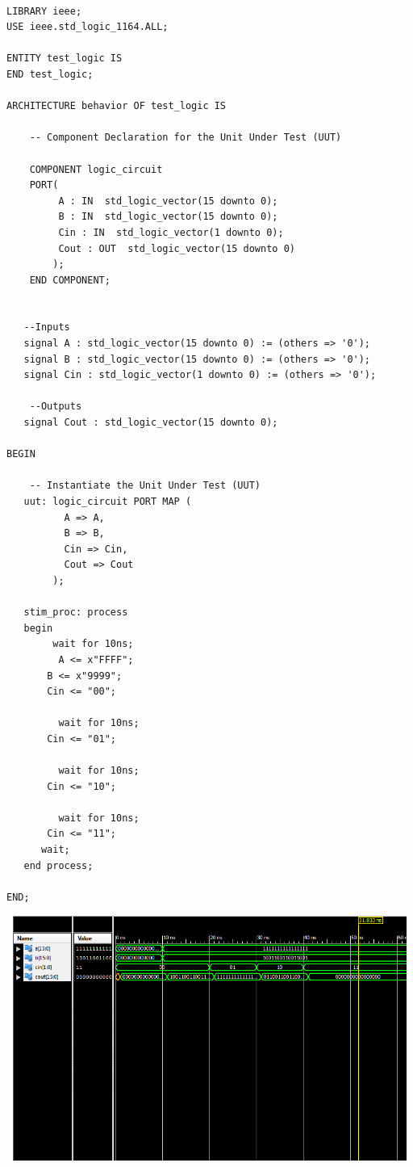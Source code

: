 \documentclass{article}
\begin{document}
\begin{lstlisting}

LIBRARY ieee;
USE ieee.std_logic_1164.ALL;

ENTITY test_logic IS
END test_logic;
 
ARCHITECTURE behavior OF test_logic IS 
 
    -- Component Declaration for the Unit Under Test (UUT)
 
    COMPONENT logic_circuit
    PORT(
         A : IN  std_logic_vector(15 downto 0);
         B : IN  std_logic_vector(15 downto 0);
         Cin : IN  std_logic_vector(1 downto 0);
         Cout : OUT  std_logic_vector(15 downto 0)
        );
    END COMPONENT;
    

   --Inputs
   signal A : std_logic_vector(15 downto 0) := (others => '0');
   signal B : std_logic_vector(15 downto 0) := (others => '0');
   signal Cin : std_logic_vector(1 downto 0) := (others => '0');

 	--Outputs
   signal Cout : std_logic_vector(15 downto 0);

BEGIN
 
	-- Instantiate the Unit Under Test (UUT)
   uut: logic_circuit PORT MAP (
          A => A,
          B => B,
          Cin => Cin,
          Cout => Cout
        );

   stim_proc: process
   begin		
		wait for 10ns;
		 A <= x"FFFF";
       B <= x"9999";
       Cin <= "00";
		 
		 wait for 10ns;
       Cin <= "01";
		 
		 wait for 10ns;
       Cin <= "10";
		 
		 wait for 10ns;
       Cin <= "11";
      wait;
   end process;

END;
\end{lstlisting}
\includegraphics[width=16cm, height=8cm]{test_logic.png}
\pagebreak
\end{document}
